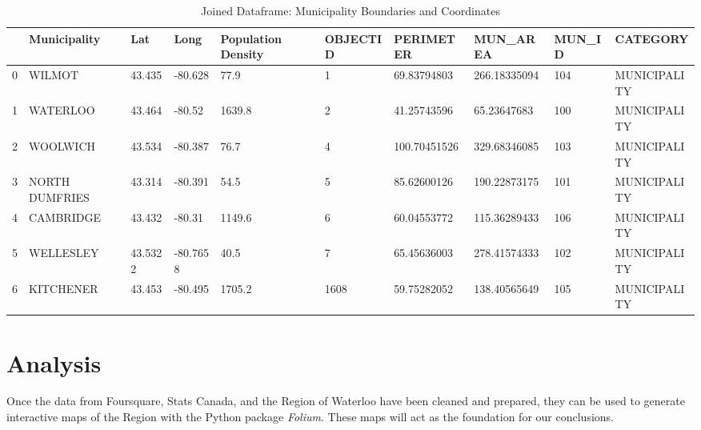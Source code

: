 \documentclass[10pt,a4paper]{report}
\begin{document}
	\begin{table}[h!]
				\centering
		\caption{Joined Dataframe: Municipality Boundaries and Coordinates}
		\label{merged_df}
		\begin{adjustbox}{width=1\textwidth}
			\small
		\begin{tabular}{@{}llllllllll@{}}
			\toprule
			& Municipality   & Lat & Long & Population Density & OBJECTID & PERIMETER    & MUN\_AREA & MUN\_ID & CATEGORY     \\ \midrule
			0 & WILMOT         & 43.435   & -80.628   & 77.9               & 1        & 69.83794803  & 266.18335094            & 104            & MUNICIPALITY \\
			1 & WATERLOO       & 43.464   & -80.52    & 1639.8             & 2        & 41.25743596  & 65.23647683             & 100            & MUNICIPALITY \\
			2 & WOOLWICH       & 43.534   & -80.387   & 76.7               & 4        & 100.70451526 & 329.68346085            & 103            & MUNICIPALITY \\
			3 & NORTH DUMFRIES & 43.314   & -80.391   & 54.5               & 5        & 85.62600126  & 190.22873175            & 101            & MUNICIPALITY \\
			4 & CAMBRIDGE      & 43.432   & -80.31    & 1149.6             & 6        & 60.04553772  & 115.36289433            & 106            & MUNICIPALITY \\
			5 & WELLESLEY      & 43.5322  & -80.7658  & 40.5               & 7        & 65.45636003  & 278.41574333            & 102            & MUNICIPALITY \\
			6 & KITCHENER      & 43.453   & -80.495   & 1705.2             & 1608     & 59.75282052  & 138.40565649            & 105            & MUNICIPALITY \\ \bottomrule
		\end{tabular}
	\end{adjustbox}
	\end{table}
	
	
	
	\chapter{Analysis}
	Once the data from Foursquare, Stats Canada, and the Region of Waterloo have been cleaned and prepared, they can be used to generate interactive maps of the Region with the Python package \textit{Folium}. These maps will act as the foundation for our conclusions. \\
	
\end{document}
